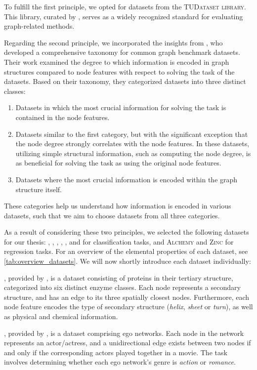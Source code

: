 To fulfill the first principle, we opted for datasets from the \textsc{TUDataset library}. This library, curated by \cite{Mor+2020}, serves as a widely recognized standard for evaluating graph-related methods.

Regarding the second principle, we incorporated the insights from \cite{Liu2022}, who developed a comprehensive taxonomy for common graph benchmark datasets. Their work examined the degree to which information is encoded in graph structures compared to node features with respect to solving the task of the datasets. Based on their taxonomy, they categorized datasets into three distinct classes:
\begin{enumerate}
	\item Datasets in which the most crucial information for solving the task is contained in the node features.
	\item Datasets similar to the first category, but with the significant exception that the node degree strongly correlates with the node features. In these datasets, utilizing simple structural information, such as computing the node degree, is as beneficial for solving the task as using the original node features.
	\item Datasets where the most crucial information is encoded within the graph structure itself.
\end{enumerate}
These categories help us understand how information is encoded in various datasets, such that we aim to choose datasets from all three categories.

As a result of considering these two principles, we selected the following datasets for our thesis: \enzymes, \imdb, \mutag, \nci, \proteins, and \reddit for classification tasks, and \textsc{Alchemy} and \textsc{Zinc} for regression tasks. For an overview of the elemental properties of each dataset, see \cref{tab:overview_datasets}. We will now shortly introduce each dataset individually:\par\medskip

\enzymes, provided by \cite{Borgwardt2005}, is a dataset consisting of proteins in their tertiary structure, categorized into six distinct enzyme classes. Each node represents a secondary structure, and has an edge to its three spatially closest nodes. Furthermore, each node feature encodes the type of secondary structure (\textit{helix}, \textit{sheet} or \textit{turn}), as well as physical and chemical information.\par\medskip


\imdb, provided by \cite{Yanardag2015}, is a dataset comprising ego networks. Each node in the network represents an actor/actress, and a unidirectional edge exists between two nodes if and only if the corresponding actors played together in a movie. The task involves determining whether each ego network's genre is \textit{action} or \textit{romance}.\par\medskip

